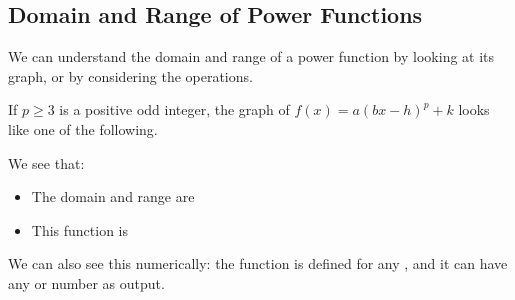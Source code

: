 \subsection{Domain and Range of Power Functions} 
We can understand the domain and range of a power function by looking at its graph, or by considering the operations.
\begin{fact}
If $p\geq 3$ is a positive odd integer, the graph of $f(x)=a(bx-h)^p+k$ looks like one of the following.
\begin{center}
\end{center}
We see that:
\begin{itemize}
\item The domain and range are \makeblank
\item This function is \makeblank
\end{itemize}
We can also see this numerically: the function is defined for any \makeblank[0.75in], and it can have any \makeblank[1in] or \makeblank[1in] number as output.
\end{fact}
